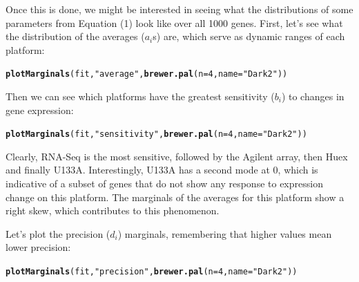 \documentclass{article}\usepackage[]{graphicx}\usepackage[]{color}
\makeatletter
\newcommand{\hlnum}[1]{\textcolor[rgb]{0.686,0.059,0.569}{#1}}%
\newcommand{\hlstr}[1]{\textcolor[rgb]{0.192,0.494,0.8}{#1}}%
\newcommand{\hlstd}[1]{\textcolor[rgb]{0.345,0.345,0.345}{#1}}%
\newcommand{\hlkwc}[1]{\textcolor[rgb]{0.333,0.667,0.333}{#1}}%
\newcommand{\hlkwd}[1]{\textcolor[rgb]{0.737,0.353,0.396}{\textbf{#1}}}%
\newenvironment{kframe}{%
 \def\at@end@of@kframe{}%
 \ifinner\ifhmode%
  \def\at@end@of@kframe{\end{minipage}}%
  \begin{minipage}{\columnwidth}%
 \fi\fi%
 \def\FrameCommand##1{\hskip\@totalleftmargin \hskip-\fboxsep
 \colorbox{shadecolor}{##1}\hskip-\fboxsep
     \hskip-\linewidth \hskip-\@totalleftmargin \hskip\columnwidth}%
 \MakeFramed {\advance\hsize-\width
   \@totalleftmargin\z@ \linewidth\hsize
   \@setminipage}}%
 {\par\unskip\endMakeFramed%
 \at@end@of@kframe}
\newenvironment{knitrout}{}{} %
\makeatother
\begin{document}
Once this is done, we might be interested in seeing what the distributions of some parameters from Equation (1) look like over all 1000 genes. First, let's see what the distribution of the averages ($a_i$s) are, which serve as dynamic ranges of each platform:

\begin{knitrout}
\color{fgcolor}\begin{kframe}
\begin{alltt}
\hlkwd{plotMarginals}\hlstd{(fit,} \hlstr{"average"}\hlstd{,} \hlkwd{brewer.pal}\hlstd{(}\hlkwc{n} \hlstd{=} \hlnum{4}\hlstd{,} \hlkwc{name} \hlstd{=} \hlstr{"Dark2"}\hlstd{))}
\end{alltt}


{\ttfamily\noindent\bfseries{}}\end{kframe}
\end{knitrout}

Then we can see which platforms have the greatest sensitivity ($b_i$) to changes in gene expression:

\begin{knitrout}
\color{fgcolor}\begin{kframe}
\begin{alltt}
\hlkwd{plotMarginals}\hlstd{(fit,} \hlstr{"sensitivity"}\hlstd{,} \hlkwd{brewer.pal}\hlstd{(}\hlkwc{n} \hlstd{=} \hlnum{4}\hlstd{,} \hlkwc{name} \hlstd{=} \hlstr{"Dark2"}\hlstd{))}
\end{alltt}


{\ttfamily\noindent\bfseries{}}\end{kframe}
\end{knitrout}

Clearly, RNA-Seq is the most sensitive, followed by the Agilent array, then Huex and finally U133A. Interestingly, U133A has a second mode at 0, which is indicative of a subset of genes that do not show any response to expression change on this platform. The marginals of the averages for this platform show a right skew, which contributes to this phenomenon. 

Let's plot the precision ($d_i$) marginals, remembering that higher values mean lower precision:

\begin{knitrout}
\color{fgcolor}\begin{kframe}
\begin{alltt}
\hlkwd{plotMarginals}\hlstd{(fit,} \hlstr{"precision"}\hlstd{,} \hlkwd{brewer.pal}\hlstd{(}\hlkwc{n} \hlstd{=} \hlnum{4}\hlstd{,} \hlkwc{name} \hlstd{=} \hlstr{"Dark2"}\hlstd{))}
\end{alltt}


{\ttfamily\noindent\bfseries{}}\end{kframe}
\end{knitrout}
\end{document}
